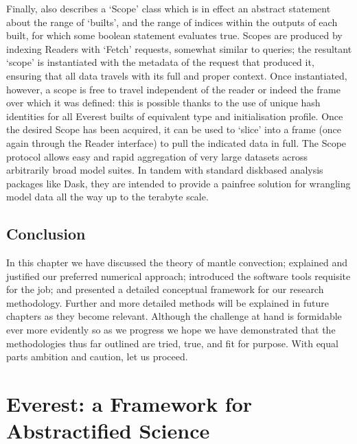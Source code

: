 \documentclass[letterpaper,10pt,english]{jupyterBook}
\begin{document}
\sphinxAtStartPar
Finally,  also describes a ‘Scope’ class which is in effect an abstract statement about the range of ‘builts’, and the range of indices within the outputs of each built, for which some boolean statement evaluates true. Scopes are produced by indexing Readers with ‘Fetch’ requests, somewhat similar to  queries; the resultant ‘scope’ is instantiated with the metadata of the request that produced it, ensuring that all data travels with its full and proper context. Once instantiated, however, a scope is free to travel independent of the reader or indeed the frame over which it was defined: this is possible thanks to the use of unique hash identities for all Everest builts of equivalent type and initialisation profile. Once the desired Scope has been acquired, it can be used to ‘slice’ into a frame (once again through the Reader interface) to pull the indicated data in full. The Scope protocol allows easy and rapid aggregation of very large datasets across arbitrarily broad model suites. In tandem with standard disk\sphinxhyphen{}based analysis packages like Dask, they are intended to provide a pain\sphinxhyphen{}free solution for wrangling model data all the way up to the terabyte scale.


\section{Conclusion}
\label{\detokenize{content/chapter_02_methods/conclusion:conclusion}}\label{\detokenize{content/chapter_02_methods/conclusion::doc}}
\sphinxAtStartPar
In this chapter we have discussed the theory of mantle convection; explained and justified our preferred numerical approach; introduced the software tools requisite for the job; and presented a detailed conceptual framework for our research methodology. Further and more detailed methods will be explained in future chapters as they become relevant. Although the challenge at hand is formidable \sphinxhyphen{} ever more evidently so as we progress \sphinxhyphen{} we hope we have demonstrated that the methodologies thus far outlined are tried, true, and fit for purpose. With equal parts ambition and caution, let us proceed.


\chapter{Everest: a Framework for Abstractified Science}
\label{\detokenize{content/chapter_03_everest/abstract:everest-a-framework-for-abstractified-science}}\label{\detokenize{content/chapter_03_everest/abstract::doc}}
\end{document}

